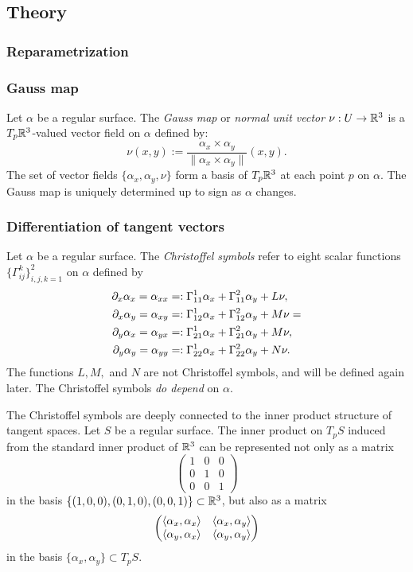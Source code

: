 \documentclass{../exp}
\def\a{\alpha}
\begin{document}
\subsection{Theory}

\subsubsection{Reparametrization}


\subsubsection{Gauss map}

\begin{defn}
Let $\a$ be a regular surface.
The \emph{Gauss map} or \emph{normal unit vector} $\nu:U\to\R^3$ is a $T_p\mathbb{R}^3$-valued vector field on $\a$ defined by:
\[\nu(x,y):=\frac{\a_x\times \a_y}{\|\a_x\times \a_y\|}(x,y).\]
The set of vector fields $\{\a_x,\a_y,\nu\}$ form a basis of $T_p\mathbb{R}^3$ at each point $p$ on $\a$.
The Gauss map is uniquely determined up to sign as $\a$ changes.
\end{defn}


\subsubsection{Differentiation of tangent vectors}
\begin{defn}
Let $\a$ be a regular surface.
The \emph{Christoffel symbols} refer to eight scalar functions $\{\Gamma_{ij}^k\}_{i,j,k=1}^2$ on $\a$ defined by
\begin{align*}
\pd_x\a_x=\a_{xx}&=:\Gamma_{11}^1\a_x+\Gamma_{11}^2\a_y+L\nu,\\
\pd_x\a_y=\a_{xy}&=:\Gamma_{12}^1\a_x+\Gamma_{12}^2\a_y+M\nu=\\
\pd_y\a_x=\a_{yx}&=:\Gamma_{21}^1\a_x+\Gamma_{21}^2\a_y+M\nu,\\
\pd_y\a_y=\a_{yy}&=:\Gamma_{22}^1\a_x+\Gamma_{22}^2\a_y+N\nu.
\end{align*}
The functions $L,M,$ and $N$ are not Christoffel symbols, and will be defined again later.
The Christoffel symbols \emph{do depend} on $\a$.
\end{defn}

The Christoffel symbols are deeply connected to the inner product structure of tangent spaces.
Let $S$ be a regular surface.
The inner product on $T_pS$ induced from the standard inner product of $\mathbb{R}^3$ can be represented not only as a matrix
\[\begin{pmatrix}1&0&0\\0&1&0\\0&0&1\end{pmatrix}\]
in the basis $\{(1,0,0),(0,1,0),(0,0,1)\}\subset\mathbb{R}^3$, but also as a matrix
\[\begin{pmatrix}\<\a_x,\a_x\>&\<\a_x,\a_y\>\\\<\a_y,\a_x\>&\<\a_y,\a_y\>\end{pmatrix}\]
in the basis $\{\a_x,\a_y\}\subset T_pS$.
\end{document}
